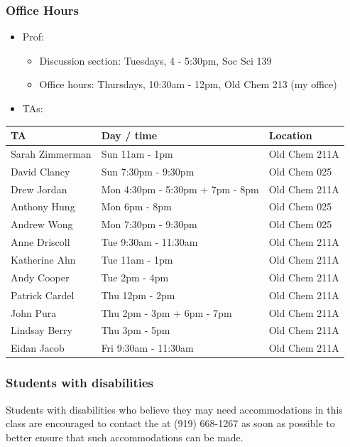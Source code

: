 \documentclass[11pt,containsverbatim,handout,xcolor=xelatex,dvipsnames,table]{beamer}
\begin{document}
\begin{frame}[shrink]
\frametitle{Office Hours}

\begin{itemize}
\item Prof:
\begin{itemize}
\item Discussion section: Tuesdays, 4 - 5:30pm, Soc Sci 139
\item Office hours: Thursdays, 10:30am - 12pm, Old Chem 213 (my office)
\end{itemize}
\item TAs: 
\end{itemize}
{\small
{}
\begin{tabular}{l | l | l}
TA				& Day / time						& Location \\
\hline
Sarah Zimmerman	& Sun 11am - 1pm					& Old Chem 211A \\
David Clancy		& Sun 7:30pm - 9:30pm				& Old Chem 025 \\
Drew Jordan		& Mon 4:30pm - 5:30pm + 7pm - 8pm	& Old Chem 211A \\
Anthony Hung		& Mon 6pm - 8pm					& Old Chem 025 \\
Andrew Wong		& Mon 7:30pm - 9:30pm				& Old Chem 025 \\ 
Anne Driscoll		& Tue 9:30am - 11:30am				& Old Chem 211A \\
Katherine Ahn		& Tue 11am - 1pm					& Old Chem 211A \\
Andy Cooper		& Tue 2pm - 4pm					& Old Chem 211A \\
Patrick Cardel 		& Thu 12pm - 2pm					& Old Chem 211A \\
John Pura			& Thu 2pm - 3pm + 6pm - 7pm			& Old Chem 211A \\
Lindsay Berry		& Thu 3pm - 5pm					& Old Chem 211A \\
Eidan Jacob		& Fri 9:30am - 11:30am				& Old Chem 211A
\end{tabular}
}

\end{frame}


\begin{frame}
\frametitle{Students with disabilities}

Students with disabilities who believe they may need accommodations in this class are 
encouraged to contact the 
 at (919) 668-1267 as soon as possible to better ensure that such 
accommodations can be made.

\vfill


\end{frame}
\end{document}

